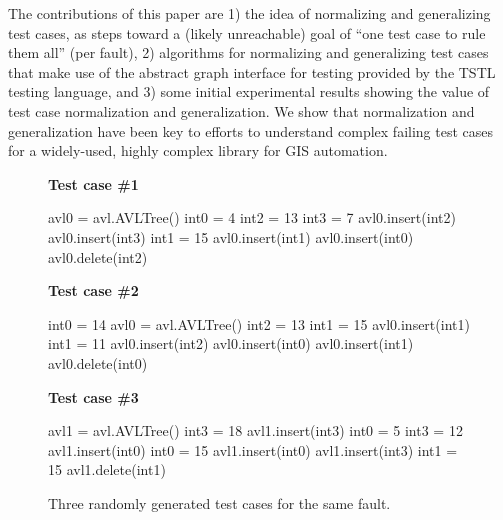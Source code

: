 The contributions of this paper are 1) the idea of normalizing and
generalizing test cases, as steps toward a (likely unreachable) goal
of ``one test case to rule them all'' (per fault), 2) algorithms for normalizing
and generalizing test cases that make use of the abstract graph
interface for testing provided by the TSTL \cite{tstl,NFM15,ISSTA15}
testing language, and 3) some initial experimental results showing the
value of test case normalization and generalization.  We show that
normalization and generalization have been key to efforts to understand
complex failing test cases for a widely-used, highly complex library
for GIS automation.

\begin{figure}
{\scriptsize
{\bf Test case \#1}
\begin{code}
avl0 = avl.AVLTree() 
int0 = 4 
int2 = 13 
int3 = 7 
avl0.insert(int2) 
avl0.insert(int3) 
int1 = 15 
avl0.insert(int1) 
avl0.insert(int0) 
avl0.delete(int2)
\end{code}
{\bf Test case \#2}
\begin{code}
int0 = 14 
avl0 = avl.AVLTree() 
int2 = 13 
int1 = 15 
avl0.insert(int1) 
int1 = 11 
avl0.insert(int2) 
avl0.insert(int0) 
avl0.insert(int1) 
avl0.delete(int0) 
\end{code}
{\bf Test case \#3}
\begin{code}
avl1 = avl.AVLTree() 
int3 = 18 
avl1.insert(int3) 
int0 = 5 
int3 = 12 
avl1.insert(int0) 
int0 = 15 
avl1.insert(int0) 
avl1.insert(int3) 
int1 = 15 
avl1.delete(int1) 
\end{code}
}
\caption {Three randomly generated test cases for the same fault.}
\label{threetests}
\end{figure}

